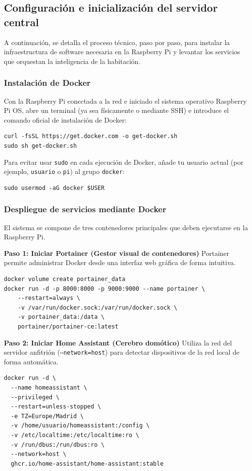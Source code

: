 \subsection{Configuración e inicialización del servidor central}
A continuación, se detalla el proceso técnico, paso por paso, para instalar la infraestructura de software necesaria en la Raspberry Pi y levantar los servicios que orquestan la inteligencia de la habitación.

\subsubsection{Instalación de Docker}
Con la Raspberry Pi conectada a la red e iniciado el sistema operativo Raspberry Pi OS, abre un terminal (ya sea físicamente o mediante SSH) e introduce el comando oficial de instalación de Docker:
\begin{verbatim}
curl -fsSL https://get.docker.com -o get-docker.sh
sudo sh get-docker.sh
\end{verbatim}
Para evitar usar \texttt{sudo} en cada ejecución de Docker, añade tu usuario actual (por ejemplo, \texttt{usuario} o \texttt{pi}) al grupo \texttt{docker}:
\begin{verbatim}
sudo usermod -aG docker $USER
\end{verbatim}

\subsubsection{Despliegue de servicios mediante Docker}
El sistema se compone de tres contenedores principales que deben ejecutarse en la Raspberry Pi.

\textbf{Paso 1: Iniciar Portainer (Gestor visual de contenedores)}
Portainer permite administrar Docker desde una interfaz web gráfica de forma intuitiva.
\begin{verbatim}
docker volume create portainer_data
docker run -d -p 8000:8000 -p 9000:9000 --name portainer \
    --restart=always \
    -v /var/run/docker.sock:/var/run/docker.sock \
    -v portainer_data:/data \
    portainer/portainer-ce:latest
\end{verbatim}

\textbf{Paso 2: Iniciar Home Assistant (Cerebro domótico)}
Utiliza la red del servidor anfitrión (\texttt{--network=host}) para detectar dispositivos de la red local de forma automática.
\begin{verbatim}
docker run -d \
  --name homeassistant \
  --privileged \
  --restart=unless-stopped \
  -e TZ=Europe/Madrid \
  -v /home/usuario/homeassistant:/config \
  -v /etc/localtime:/etc/localtime:ro \
  -v /run/dbus:/run/dbus:ro \
  --network=host \
  ghcr.io/home-assistant/home-assistant:stable
\end{verbatim}

